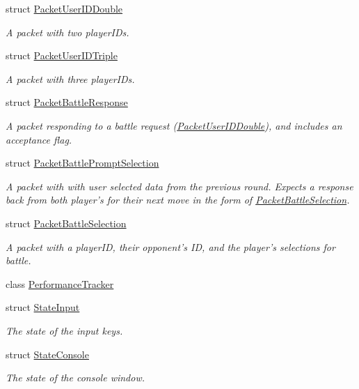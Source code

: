 \begin{DoxyCompactItemize}
struct \hyperlink{struct_packet_user_i_d_double}{Packet\-User\-I\-D\-Double}
\begin{DoxyCompactList}\small\item\em A packet with two player\-I\-Ds. \end{DoxyCompactList}\item 
struct \hyperlink{struct_packet_user_i_d_triple}{Packet\-User\-I\-D\-Triple}
\begin{DoxyCompactList}\small\item\em A packet with three player\-I\-Ds. \end{DoxyCompactList}\item 
struct \hyperlink{struct_packet_battle_response}{Packet\-Battle\-Response}
\begin{DoxyCompactList}\small\item\em A packet responding to a battle request (\hyperlink{struct_packet_user_i_d_double}{Packet\-User\-I\-D\-Double}), and includes an acceptance flag. \end{DoxyCompactList}\item 
struct \hyperlink{struct_packet_battle_prompt_selection}{Packet\-Battle\-Prompt\-Selection}
\begin{DoxyCompactList}\small\item\em A packet with with user selected data from the previous round. Expects a response back from both player's for their next move in the form of \hyperlink{struct_packet_battle_selection}{Packet\-Battle\-Selection}. \end{DoxyCompactList}\item 
struct \hyperlink{struct_packet_battle_selection}{Packet\-Battle\-Selection}
\begin{DoxyCompactList}\small\item\em A packet with a player\-I\-D, their opponent's I\-D, and the player's selections for battle. \end{DoxyCompactList}\item 
class \hyperlink{class_performance_tracker}{Performance\-Tracker}
\item 
struct \hyperlink{struct_state_input}{State\-Input}
\begin{DoxyCompactList}\small\item\em The state of the input keys. \end{DoxyCompactList}\item 
struct \hyperlink{struct_state_console}{State\-Console}
\begin{DoxyCompactList}\small\item\em The state of the console window. \end{DoxyCompactList}\item 

\end{DoxyCompactItemize}
